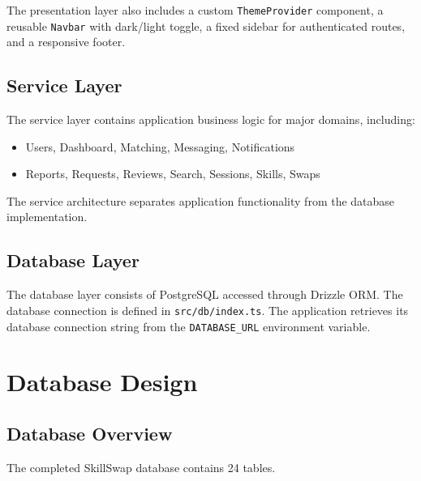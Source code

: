 \documentclass[12pt,a4paper]{report}
\begin{document}
The presentation layer also includes a custom \texttt{ThemeProvider} component,
a reusable \texttt{Navbar} with dark/light toggle, a fixed sidebar for
authenticated routes, and a responsive footer.

\section{Service Layer}
The service layer contains application business logic for major domains,
including:

\begin{itemize}[noitemsep]
  \item Users, Dashboard, Matching, Messaging, Notifications
  \item Reports, Requests, Reviews, Search, Sessions, Skills, Swaps
\end{itemize}

The service architecture separates application functionality from the database
implementation.

\section{Database Layer}
The database layer consists of PostgreSQL accessed through Drizzle ORM.  The
database connection is defined in \texttt{src/db/index.ts}.  The application
retrieves its database connection string from the \texttt{DATABASE\_URL}
environment variable.

\chapter{Database Design}

\section{Database Overview}
The completed SkillSwap database contains 24 tables.
\end{document}
